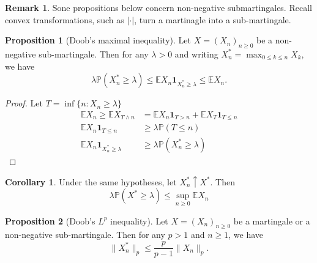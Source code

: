 \documentclass[parskip=full]{article}
\theoremstyle{definition}
\newtheorem{corollary}{Corollary}
\newtheorem{proposition}{Proposition}[section]
\newtheorem*{remark}{Remark}
\newcommand{\Pbb}{\mathbb{P}}
\newcommand{\1}{\mathbbm{1}}
\newcommand{\E}{\mathbb{E}}
\begin{document}
\begin{remark}
  Sone propositions below concern non-negative submartingales. Recall convex transformations, such as $|\cdot|$, turn a martinagle into a sub-martingale.
\end{remark}

\begin{proposition}[Doob's maximal inequality]
  Let $X = (X_n)_{n \geq 0}$ be a non-negative sub-martingale. Then for any $\lambda > 0$ and writing $X^*_n = \max_{0 \leq k \leq n} X_k$, we have
  \[
    \lambda \Pbb(X^*_n \geq \lambda) \leq \E X_n \mathbf{1}_{X^*_n \geq \lambda} \leq \E X_n.
  \]
\end{proposition}

\begin{proof}
  Let $T = \inf\{n: X_n \geq \lambda\}$
  \begin{align*}
    \E X_n \geq \E X_{T \wedge n} &= \E X_n \mathbf{1}_{T > n} + \E X_T \mathbf{1}_{T \leq n} \\
    \E X_n \mathbf{1}_{T \leq n} &\geq \lambda \Pbb(T \leq n) \\
    \E X_n \mathbf{1}_{X^*_n \geq \lambda} &\geq \lambda \Pbb(X^*_n \geq \lambda)
  \end{align*}
\end{proof}

\begin{corollary} \label{Doob's maximal inequality limit}
  Under the same hypotheses, let $X^*_n \uparrow X^*$. Then
  \[
    \lambda \Pbb(X^* \geq \lambda) \leq \sup_{n \geq 0} \E X_n
  \]
\end{corollary}

\begin{proposition}[Doob's $L^p$ inequality]
  Let $X = (X_n)_{n \geq 0}$ be a martingale or a non-negative sub-martingale. Then for any $p > 1$ and $n \geq 1$, we have
  \[
    \|X^*_n\|_p \leq \frac{p}{p - 1} \|X_n\|_p.
  \]
\end{proposition}
\end{document}
